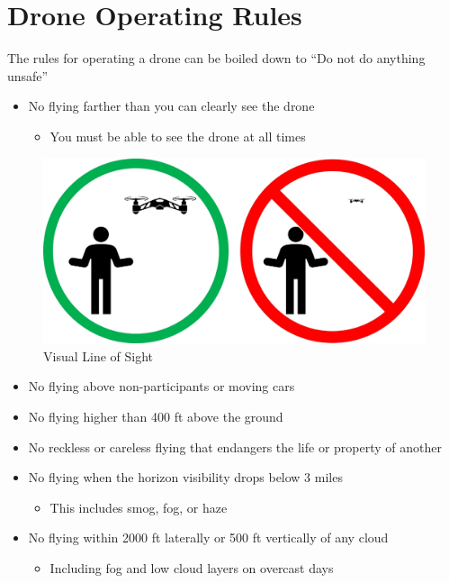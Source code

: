 \documentclass[
]{book}
\providecommand{\tightlist}{%
  \setlength{\itemsep}{0pt}\setlength{\parskip}{0pt}}
\begin{document}
\hypertarget{drone-operating-rules}{%
\section{Drone Operating Rules}\label{drone-operating-rules}}

The rules for operating a drone can be boiled down to ``Do not do anything unsafe''

\begin{itemize}
\tightlist
\item
  No flying farther than you can clearly see the drone

  \begin{itemize}
  \tightlist
  \item
    You must be able to see the drone at all times
  \end{itemize}
\end{itemize}

\begin{figure}

{\centering \includegraphics[width=0.9\linewidth]{images/VLOS_simple} 

}

\caption{Visual Line of Sight}\label{fig:VLOS}
\end{figure}

\begin{itemize}
\tightlist
\item
  No flying above non-participants or moving cars
\item
  No flying higher than 400 ft above the ground
\item
  No reckless or careless flying that endangers the life or property of another
\item
  No flying when the horizon visibility drops below 3 miles

  \begin{itemize}
  \tightlist
  \item
    This includes smog, fog, or haze
  \end{itemize}
\item
  No flying within 2000 ft laterally or 500 ft vertically of any cloud

  \begin{itemize}
  \tightlist
  \item
    Including fog and low cloud layers on overcast days
  \end{itemize}
\end{itemize}
\end{document}
